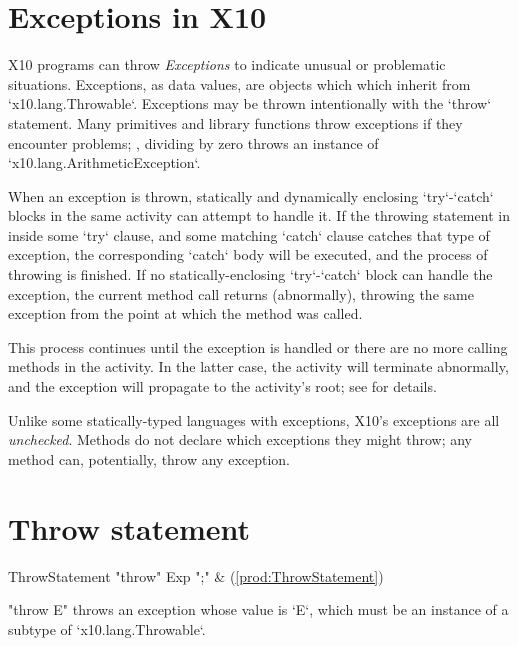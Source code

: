 \section{Exceptions in X10}

X10 programs can throw {\em Exceptions} to indicate unusual or problematic
situations.  Exceptions, as data values, are objects which which inherit from
\xcd`x10.lang.Throwable`.    Exceptions may be thrown intentionally with the
\xcd`throw` statement. Many primitives and library functions throw exceptions
if they encounter problems; \eg, dividing by zero throws an instance of
\xcd`x10.lang.ArithmeticException`. 

When an exception is thrown, statically and dynamically enclosing
\xcd`try`-\xcd`catch` blocks in the same activity can attempt to handle it.   If the throwing
statement in inside some \xcd`try` clause, and some matching \xcd`catch`
clause catches that type of exception, the corresponding \xcd`catch` body will
be executed, and the process of throwing is finished.  
If no statically-enclosing \xcd`try`-\xcd`catch` block can handle the
exception, the current method call returns (abnormally), throwing the same
exception from the point at which the method was called.  

This process continues until the exception is handled or there are no more
calling methods in the activity. In the latter case, the activity will
terminate abnormally, and the exception will propagate to the activity's root;
see  for details.

Unlike some statically-typed languages with exceptions, X10's exceptions are
all {\em unchecked}. Methods do not declare which exceptions they might throw;
any method can, potentially, throw any exception.


\section{Throw statement}

\begin{bbgrammar}
      ThrowStatement \: \xcd"throw" Exp \xcd";" & (\ref{prod:ThrowStatement}) \\
\end{bbgrammar}

\xcd"throw E" throws an exception whose value is \xcd`E`, which must be an
instance of a subtype of \xcd`x10.lang.Throwable`. 

